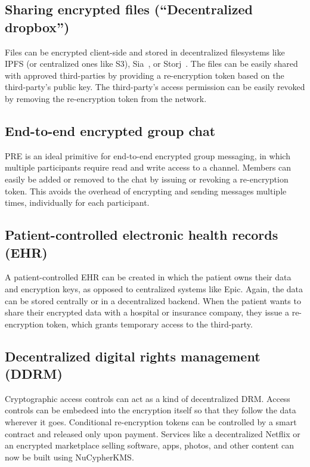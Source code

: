 \documentclass[notitlepage,longbibliography]{revtex4-1}
\newcommand{\kms}{NuCypherKMS}
\begin{document}
\subsection{Sharing encrypted files (``Decentralized dropbox'')}
Files can be encrypted client-side and stored in decentralized filesystems like IPFS (or centralized ones like S3), Sia~\cite{web:sia}, or Storj~\cite{web:storj}.
The files can be easily shared with approved third-parties by providing a re-encryption token based on the third-party's
public key.
The third-party's access permission can be easily revoked by removing the re-encryption token from the network.

\subsection{End-to-end encrypted group chat}
PRE is an ideal primitive for end-to-end encrypted group messaging, in which multiple participants require read and write
access to a channel. Members can easily be added or removed to the chat by issuing or revoking a re-encryption token.
This avoids the overhead of encrypting and sending messages multiple times, individually for each participant.

\subsection{Patient-controlled electronic health records (EHR)}
A patient-controlled EHR can be created in which the patient owns their data and encryption keys, as opposed to centralized
systems like Epic.
Again, the data can be stored centrally or in a decentralized backend.
When the patient wants to share their encrypted data with a hospital or insurance company, they issue a re-encryption token,
which grants temporary access to the third-party.

\subsection{Decentralized digital rights management (DDRM)}
Cryptographic access controls can act as a kind of decentralized DRM.
Access controls can be embedeed into the encryption itself so that they follow the data wherever it goes.
Conditional re-encryption tokens can be controlled by a smart contract and released only upon payment.
Services like a decentralized Netflix or an encrypted marketplace selling software, apps, photos, and other content
can now be built using \kms.
\end{document}
